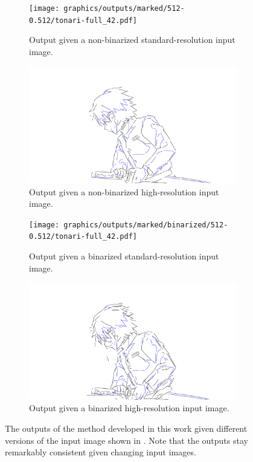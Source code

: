 \begin{figure}
    \centering
    \begin{subfigure}{.45\textwidth}
        \texttt{[image: graphics/outputs/marked/512-0.512/tonari-full\_42.pdf]}
        \caption{Output given a non-binarized standard-resolution input image.}
    \end{subfigure}
    \begin{subfigure}{.45\textwidth}
        \includegraphics[width=\textwidth]{graphics/outputs/marked/1024-1.024/tonari-full_42.pdf}
        \caption{Output given a non-binarized high-resolution input image.}
    \end{subfigure}
    \begin{subfigure}{.45\textwidth}
        \texttt{[image: graphics/outputs/marked/binarized/512-0.512/tonari-full\_42.pdf]}
        \caption{Output given a binarized standard-resolution input image.}
    \end{subfigure}
    \begin{subfigure}{.45\textwidth}
        \includegraphics[width=\textwidth]{graphics/outputs/marked/binarized/1024-1.024/tonari-full_42.pdf}
        \caption{Output given a binarized high-resolution input image.}
    \end{subfigure}
    \caption{The outputs of the method developed in this work given different versions of the input image shown in . Note that the outputs stay remarkably consistent given changing input images.}
    \label{fig:tonari-full_42_full.marked.combinations}
\end{figure}

